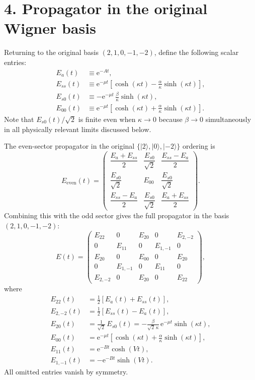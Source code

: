 \documentclass[11pt]{article}
\newcommand{\e}{\mathrm{e}}
\begin{document}
\section*{4. Propagator in the original Wigner basis}

Returning to the original basis $(2,1,0,-1,-2)$, define the following scalar entries:
\begin{align}
E_a(t) &\equiv \e^{-At}, \\
E_{ss}(t) &\equiv \e^{-\mu t}\left[\cosh(\kappa t)-\frac{\alpha}{\kappa}\sinh(\kappa t)\right],\\
E_{s0}(t) &\equiv -\e^{-\mu t}\,\frac{\beta}{\kappa}\sinh(\kappa t),\\
E_{00}(t) &\equiv \e^{-\mu t}\left[\cosh(\kappa t)+\frac{\alpha}{\kappa}\sinh(\kappa t)\right].
\end{align}
Note that $E_{s0}(t)/\sqrt{2}$ is finite even when $\kappa\to 0$ because $\beta\to0$ simultaneously in all physically relevant limits discussed below.

The even-sector propagator in the original $\{|2\rangle,|0\rangle,|-2\rangle\}$ ordering is
\begin{equation}
E_{\mathrm{even}}(t)=
\begin{pmatrix}
\dfrac{E_a+E_{ss}}{2} & \dfrac{E_{s0}}{\sqrt{2}} & \dfrac{E_{ss}-E_a}{2}\\[1.2ex]
\dfrac{E_{s0}}{\sqrt{2}} & E_{00} & \dfrac{E_{s0}}{\sqrt{2}}\\[1.2ex]
\dfrac{E_{ss}-E_a}{2} & \dfrac{E_{s0}}{\sqrt{2}} & \dfrac{E_a+E_{ss}}{2}
\end{pmatrix}.
\end{equation}
Combining this with the odd sector gives the full propagator in the basis $(2,1,0,-1,-2)$:
\begin{equation}
E(t)=
\begin{pmatrix}
E_{22} & 0 & E_{20} & 0 & E_{2,-2}\\
0 & E_{11} & 0 & E_{1,-1} & 0\\
E_{20} & 0 & E_{00} & 0 & E_{20}\\
0 & E_{1,-1} & 0 & E_{11} & 0\\
E_{2,-2} & 0 & E_{20} & 0 & E_{22}
\end{pmatrix},
\end{equation}
where
\begin{align}
E_{22}(t) &= \frac12\left[E_a(t)+E_{ss}(t)\right], \\
E_{2,-2}(t) &= \frac12\left[E_{ss}(t)-E_a(t)\right], \\
E_{20}(t) &= \frac{1}{\sqrt{2}}\,E_{s0}(t)
= -\frac{\beta}{\sqrt{2}\,\kappa}\,\e^{-\mu t}\sinh(\kappa t), \\
E_{00}(t) &= \e^{-\mu t}\left[\cosh(\kappa t)+\frac{\alpha}{\kappa}\sinh(\kappa t)\right], \\
E_{11}(t) &= \e^{-Bt}\cosh(Vt), \\
E_{1,-1}(t) &= -\e^{-Bt}\sinh(Vt).
\end{align}
All omitted entries vanish by symmetry.
\end{document}
